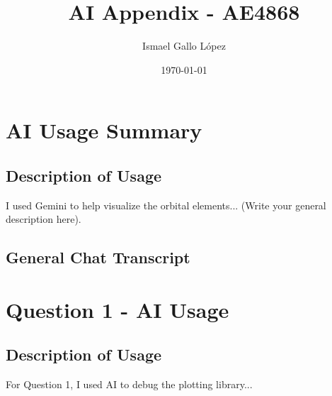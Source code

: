 \documentclass[a4paper,12pt]{article}
\title{AI Appendix - AE4868}
\author{Ismael Gallo López} %
\date{\today}
\begin{document}
\maketitle

\section*{AI Usage Summary}

\subsection*{Description of Usage}
I used Gemini to help visualize the orbital elements... (Write your general description here).

\subsection*{General Chat Transcript}

\newpage

\section*{Question 1 - AI Usage}

\subsection*{Description of Usage}
For Question 1, I used AI to debug the plotting library...

\end{document}
